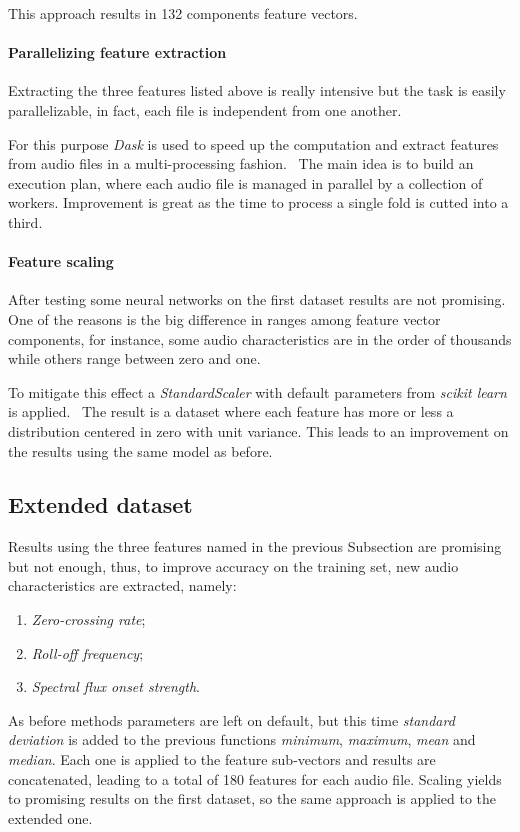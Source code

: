 This approach results in 132 components feature vectors.

\paragraph{Parallelizing feature extraction}
Extracting the three features listed above is really intensive 
but the task is easily parallelizable, in fact, each file is independent 
from one another.

For this purpose \emph{Dask} is used to speed up the computation and 
extract features from audio files in a multi-processing fashion.~\cite{dask}
The main idea is to build an execution plan, where each audio file 
is managed in parallel by a collection of workers. 
Improvement is great as the time to process a single fold 
is cutted into a third.

\paragraph{Feature scaling}
After testing some neural networks on the first dataset results 
are not promising. One of the reasons is the big difference in 
ranges among feature vector components, for instance, 
some audio characteristics are in the order of thousands while others 
range between zero and one.

To mitigate this effect a \emph{StandardScaler} with default parameters from \emph{scikit learn} is applied.~\cite{scaler}
The result is a dataset where each feature has more or less a distribution 
centered in zero with unit variance.
This leads to an improvement on the results using the same
model as before. 


\subsection{Extended dataset}
\label{extended-dataset}

Results using the three features named in the previous Subsection 
are promising but not enough, thus, to improve accuracy on the training set, 
new audio characteristics are extracted, namely:
\begin{enumerate}
    \item \emph{Zero-crossing rate};
    \item \emph{Roll-off frequency};
    \item \emph{Spectral flux onset strength}.
\end{enumerate}
As before methods parameters are left on default, but 
this time \emph{standard deviation} is added to
the previous functions \emph{minimum}, \emph{maximum}, \emph{mean} 
and \emph{median}. Each one is applied to the feature sub-vectors and 
results are concatenated, leading to a total of 180 features for each audio file.
Scaling yields to promising results on the first dataset, 
so the same approach is applied to the extended one.

